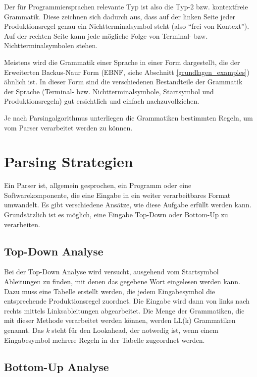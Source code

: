 Der für Programmiersprachen relevante Typ ist also die Typ-2 bzw. kontextfreie Grammatik. Diese zeichnen sich dadurch aus, dass auf der linken Seite jeder Produktionsregel genau ein Nichtterminalsymbol steht (also ``frei von Kontext''). Auf der rechten Seite kann jede mögliche Folge von Terminal- bzw. Nichtterminalsymbolen stehen.



Meistens wird die Grammatik einer Sprache in einer Form dargestellt, die der Erweiterten Backus-Naur Form (EBNF, siehe Abschnitt \ref{grundlagen_examples}) ähnlich ist. In dieser Form sind die verschiedenen Bestandteile der Grammatik der Sprache (Terminal- bzw. Nichtterminalsymbole, Startsymbol und Produktionsregeln) gut ersichtlich und einfach nachzuvollziehen.

Je nach Parsingalgorithmus unterliegen die Grammatiken bestimmten Regeln, um vom Parser verarbeitet werden zu können.


\section{Parsing Strategien}
\label{theorie_parsing_strategien}

Ein Parser ist, allgemein gesprochen, ein Programm oder eine Softwarekomponente, die eine Eingabe in ein weiter verarbeitbares Format umwandelt. Es gibt verschiedene Ansätze, wie diese Aufgabe erfüllt werden kann. Grund\-sätz\-lich ist es möglich, eine Eingabe Top-Down oder Bottom-Up zu verarbeiten.

\subsection{Top-Down Analyse}

Bei der Top-Down Analyse wird versucht, ausgehend vom Startsymbol Ab\-lei\-tun\-gen zu finden, mit denen das gegebene Wort eingelesen werden kann. Dazu muss eine Tabelle erstellt werden, die jedem Eingabesymbol die ent\-sprech\-en\-de Produktionsregel zuordnet. Die Eingabe wird dann von links nach rechts mittels Linksableitungen abgearbeitet. Die Menge der Grammatiken, die mit dieser Methode verarbeitet werden können, werden LL(k) Grammatiken genannt. Das \emph{k} steht für den Lookahead, der notwedig ist, wenn einem Eingabesymbol mehrere Regeln in der Tabelle zugeordnet werden.


\subsection{Bottom-Up Analyse}

